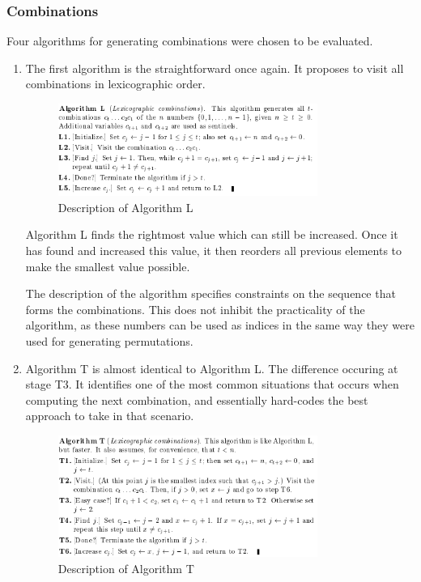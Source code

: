 \documentclass[12pt]{article}
\begin{document}
\subsubsection{Combinations}

Four algorithms for generating combinations were chosen to be evaluated.

\begin{enumerate}
\item The first algorithm is the straightforward once again. It proposes to visit all combinations in lexicographic order.

\begin{figure}[h]
\centering
\includegraphics[width=0.8\textwidth]{images/comb_L.PNG}
\caption{Description of Algorithm L \cite{comb_L}}
\end{figure}

Algorithm L finds the rightmost value which can still be increased. Once it has found and increased this value, it then reorders all previous elements to make the smallest value possible.

The description of the algorithm specifies constraints on the sequence that forms the combinations. This does not inhibit the practicality of the algorithm, as these numbers can be used as indices in the same way they were used for generating permutations.

\pagebreak

\item Algorithm T is almost identical to Algorithm L. The difference occuring at stage T3. It identifies one of the most common situations that occurs when computing the next combination, and essentially hard-codes the best approach to take in that scenario.

\begin{figure}[h]
\centering
\includegraphics[width=0.8\textwidth]{images/comb_T.PNG}
\caption{Description of Algorithm T \cite{comb_T}}
\end{figure}


\end{enumerate}
\end{document}
